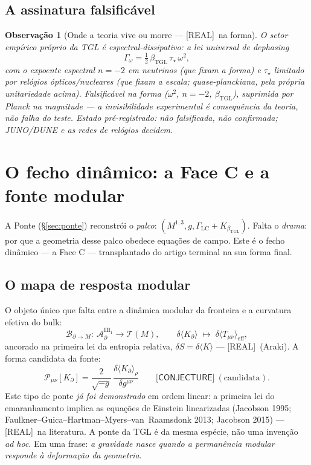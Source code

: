 \documentclass[11pt,a4paper]{article}
\newcommand{\REAL}{\textsf{[REAL]}}
\newcommand{\CONJ}{\textsf{[CONJECTURE]}}
\newcommand{\bTGL}{\beta_{\mathrm{TGL}}}
\newcommand{\Alg}{\mathcal A}
\newtheorem{remark}{Observação}
\begin{document}
\subsection{A assinatura falsificável}
\begin{remark}[Onde a teoria vive ou morre --- \REAL\ na forma]
O setor empírico próprio da TGL é espectral-dissipativo: a lei universal de
\emph{dephasing}
\begin{equation}
\Gamma_\omega=\tfrac12\,\bTGL\,\tau_\star\,\omega^2,
\end{equation}
com o expoente espectral $n=-2$ em neutrinos (que fixam a \emph{forma}) e
$\tau_\star$ limitado por relógios ópticos/nucleares (que fixam a
\emph{escala}; quase-planckiana, pela própria unitariedade acima).
Falsificável na forma ($\omega^2$, $n=-2$, $\bTGL$), suprimida por Planck na
magnitude --- a invisibilidade experimental é \emph{consequência} da teoria,
não falha do teste. Estado pré-registrado: \emph{não falsificada, não
confirmada}; JUNO/DUNE e as redes de relógios decidem.
\end{remark}

\section{O fecho dinâmico: a Face C e a fonte modular}\label{sec:faceC}
A Ponte (\S\ref{sec:ponte}) reconstrói o \emph{palco}:
$(M^{1,3},g,\Gamma_{\mathrm{LC}}+K_{\bTGL})$. Falta o \emph{drama}: por que
a geometria desse palco obedece equações de campo. Este é o fecho dinâmico
--- a Face C --- transplantado do artigo terminal na sua forma final.

\subsection{O mapa de resposta modular}
O objeto único que falta entre a dinâmica modular da fronteira e a curvatura
efetiva do bulk:
\begin{equation}
\mathcal B_{\partial\to M}:\
\Alg_\partial^{\mathrm{III}_1}\to\mathcal T(M),
\qquad
\delta\langle K_\partial\rangle\;\longmapsto\;
\delta\langle T_{\mu\nu}\rangle_{\mathrm{eff}},
\end{equation}
ancorado na primeira lei da entropia relativa,
$\delta S=\delta\langle K\rangle$ --- \REAL\ (Araki). A forma candidata da
fonte:
\begin{equation}
\mathcal P_{\mu\nu}[K_\partial]
=\frac{2}{\sqrt{-g}}\,
\frac{\delta\langle K_\partial\rangle_\rho}{\delta g^{\mu\nu}}
\qquad\CONJ\ (\text{candidata}).
\end{equation}
Este tipo de ponte \emph{já foi demonstrado} em ordem linear: a primeira lei
do emaranhamento implica as equações de Einstein linearizadas (Jacobson
1995; Faulkner--Guica--Hartman--Myers--van~Raamsdonk 2013; Jacobson 2015)
--- \REAL\ na literatura. A ponte da TGL é da mesma espécie, não uma
invenção \emph{ad hoc}. Em uma frase: \emph{a gravidade nasce quando a
permanência modular responde à deformação da geometria}.
\end{document}
